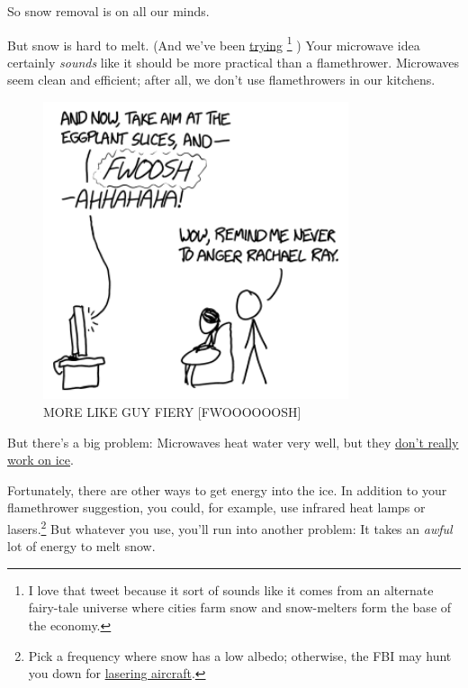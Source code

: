 {{So snow removal is on all our minds.}

{But snow is hard to melt. (And we've been \href{https://twitter.com/NotifyBoston/status/564524089017401347}{trying} {\footnote{I love that tweet because it sort of sounds like it comes from an alternate fairy-tale universe where cities farm snow and snow-melters form the base of the economy.} }) Your microwave idea certainly \emph{sounds} like it should be more practical than a flamethrower. Microwaves seem clean and efficient; after all, we don't use flamethrowers in our kitchens.}

\begin{figure}[!htbp]
\centering
\includegraphics[scale=0.5, max width=0.8\textwidth]{imgs/a/130/kitchen.png}
\caption{MORE LIKE GUY FIERY [FWOOOOOOSH]}
\end{figure}

{But there's a big problem: Microwaves heat water very well, but they \href{http://www.thenakedscientists.com/HTML/content/kitchenscience/exp/-324719c1f8/}{don't really work on ice}.}

{Fortunately, there are other ways to get energy into the ice. In addition to your flamethrower suggestion, you could, for example, use infrared heat lamps or lasers.{\footnote{Pick a frequency where snow has a low albedo; otherwise, the FBI may hunt you down for \href{http://www.nbcnews.com/tech/tech-news/why-its-terrible-idea-point-lasers-airplanes-n28841}{lasering aircraft}.} } But whatever you use, you'll run into another problem: It takes an \emph{awful} lot of energy to melt snow.}

}
